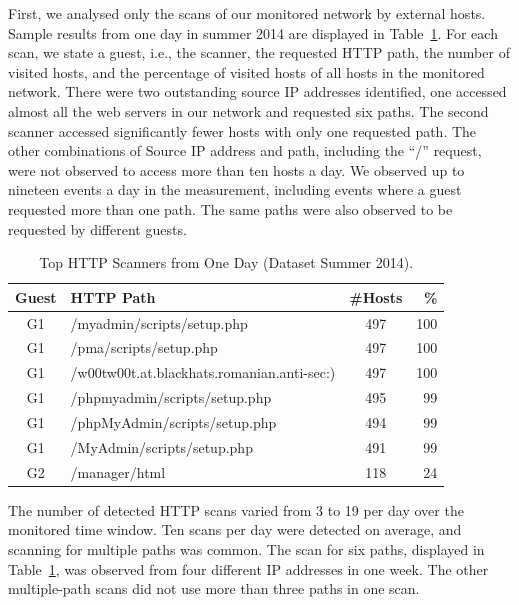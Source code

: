 First, we analysed only the scans of our monitored network by external hosts. Sample results from one day in summer 2014 are displayed in Table~\ref{tab:httpsecurity-scanners}. For each scan, we state a guest, i.e., the scanner, the requested HTTP path, the number of visited hosts, and the percentage of visited hosts of all hosts in the monitored network. There were two outstanding source IP addresses identified, one accessed almost all the web servers in our network and requested six paths. The second scanner accessed significantly fewer hosts with only one requested path. The other combinations of Source IP address and path, including the ``/'' request, were not observed to access more than ten hosts a day. We observed up to nineteen events a day in the measurement, including events where a guest requested more than one path. The same paths were also observed to be requested by different guests.

\begin{table}[ht]
\centering
\begin{tabular}{| c | l | c | r |} \hline
Guest & HTTP Path & \#Hosts & \% \\ \hline
G1 & /myadmin/scripts/setup.php                 & 497 & 100 \\ \hline
G1 & /pma/scripts/setup.php                     & 497 & 100 \\ \hline
G1 & /w00tw00t.at.blackhats.romanian.anti-sec:) & 497 & 100 \\ \hline
G1 & /phpmyadmin/scripts/setup.php              & 495 &  99 \\ \hline
G1 & /phpMyAdmin/scripts/setup.php              & 494 &  99 \\ \hline
G1 & /MyAdmin/scripts/setup.php                 & 491 &  99 \\ \hline
G2 & /manager/html                              & 118 &  24 \\ \hline
\end{tabular}
\caption{Top HTTP Scanners from One Day (Dataset Summer 2014).}
\label{tab:httpsecurity-scanners}
\end{table}

The number of detected HTTP scans varied from 3 to 19 per day over the monitored time window. Ten scans per day were detected on average, and scanning for multiple paths was common. The scan for six paths, displayed in Table~\ref{tab:httpsecurity-scanners}, was observed from four different IP addresses in one week. The other multiple-path scans did not use more than three paths in one scan.

